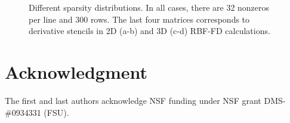 \documentclass[10pt,conference,compsocconf]{IEEEtran}
\begin{document}
\begin{figure}
\begin{center}
  \end{center}
  
  \caption{Different sparsity distributions. In all cases, there are
    32 nonzeros per line and 300 rows. The last four matrices
    corresponds to derivative stencils in 2D (a-b) and 3D (c-d) RBF-FD
    calculations.}
  \label{fig:spy_plots}
\end{figure}


\section*{Acknowledgment}
The first and last authors acknowledge NSF funding under NSF grant DMS-\#0934331 (FSU). 



\end{document}
